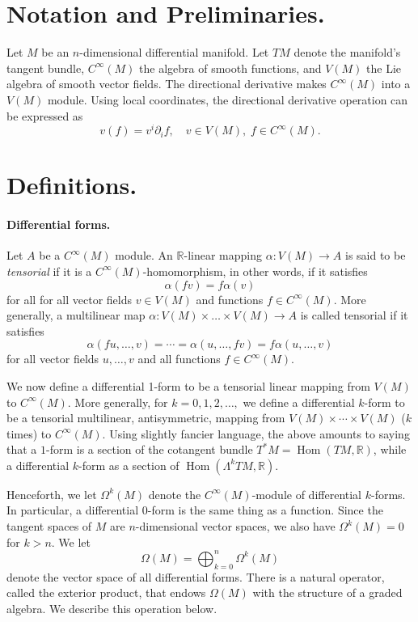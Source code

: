 \documentclass[12pt]{article}
\newcommand{\Rset}{\mathbb{R}}
\newcommand{\Hom}{\operatorname{Hom}}
\begin{document}
\section{Notation and Preliminaries.}
Let $M$ be an $n$-dimensional differential manifold.  Let $TM$ denote
the manifold's tangent bundle, $C^\infty(M)$ the algebra of smooth
functions, and $ V(M)$ the Lie algebra of smooth vector fields.  The
directional derivative  makes $C^\infty(M)$ into a $V(M)$
module.  Using local coordinates, the directional derivative operation
can be expressed as
\[ v(f) = v^i \partial_i f,\quad v\in V(M),\; f\in C^\infty(M).\]


\section{Definitions.}
\paragraph{Differential forms.} 
Let $A$ be a $C^\infty(M)$ module. An $ \mathbb{R}$-linear mapping $ \alpha: V(M)\to A$ is said to be \emph{tensorial} if it is a
$C^\infty(M)$-homomorphism, in other words, if it satisfies
\[  \alpha(f v) = f \alpha(v)  \]
for all
for all vector fields $v\in V(M)$ and functions $f\in C^\infty(M)$.
More generally, a multilinear map $\alpha: V(M)\times\dots\times
V(M)\to A$ is called tensorial if it satisfies
\[
  \alpha(f u,\dots,v)  =   \cdots = \alpha(u,\dots, fv) = f \alpha(u,\dots, v)
\]
for all vector fields $u,\dots,v$ and all functions $f\in C^\infty(M)$.



We now define a differential 1-form to be a tensorial linear mapping
from $V(M)$ to $C^\infty(M)$.  More generally, for $k=0,1,2,\ldots, $ we
define a differential $k$-form to be a tensorial multilinear,
antisymmetric, mapping from $V(M)\times \cdots \times V(M)$ ($k$
times) to $C^\infty(M)$.  Using slightly fancier language, the above amounts
to saying that a $1$-form is a section of the cotangent bundle $T^*M =
\Hom(TM,\Rset)$, while a differential $k$-form as a section of
$\Hom(\Lambda^k TM,\Rset)$. 

Henceforth, we let $\Omega^k(M)$ denote the $C^\infty(M)$-module of
differential $k$-forms. In particular, a differential $0$-form is the
same thing as a function.  Since the tangent spaces of $M$ are
$n$-dimensional vector spaces, we also have $\Omega^k(M)=0$ for $k>n$.
We let
\[\Omega(M) = \bigoplus_{k=0}^n \Omega^k(M)\]
denote the vector space of all differential forms.  There is a natural
operator, called the exterior product, that endows $\Omega(M)$ with
the structure of a graded algebra.  We describe this operation below.
\end{document}
